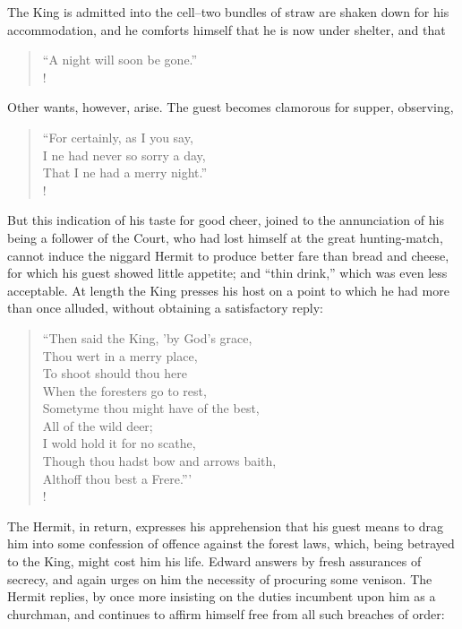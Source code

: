 The King is admitted into the cell--two bundles of straw are shaken down
for his accommodation, and he comforts himself that he is now under
shelter, and that

\begin{verse}
``A night will soon be gone.''\\!
\end{verse}

Other wants, however, arise. The guest becomes clamorous for supper,
observing,

\begin{verse}
``For certainly, as I you say,\\
I ne had never so sorry a day,\\
That I ne had a merry night.''\\!
\end{verse}

But this indication of his taste for good cheer, joined to the
annunciation of his being a follower of the Court, who had lost himself
at the great hunting-match, cannot induce the niggard Hermit to produce
better fare than bread and cheese, for which his guest showed little
appetite; and ``thin drink,'' which was even less acceptable. At length
the King presses his host on a point to which he had more than once
alluded, without obtaining a satisfactory reply:

\begin{verse}
``Then said the King, 'by God's grace,\\
Thou wert in a merry place,\\
To shoot should thou here\\
When the foresters go to rest,\\
Sometyme thou might have of the best,\\
All of the wild deer;\\
I wold hold it for no scathe,\\
Though thou hadst bow and arrows baith,\\
Althoff thou best a Frere.'''\\!
\end{verse}

The Hermit, in return, expresses his apprehension that his guest means
to drag him into some confession of offence against the forest laws,
which, being betrayed to the King, might cost him his life. Edward
answers by fresh assurances of secrecy, and again urges on him the
necessity of procuring some venison. The Hermit replies, by once more
insisting on the duties incumbent upon him as a churchman, and continues
to affirm himself free from all such breaches of order:

